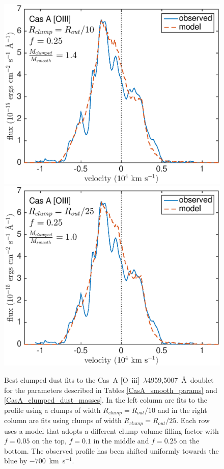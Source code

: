 \begin{figure}
\vspace{6mm}
\includegraphics[scale=0.43,clip=true, trim=30 0 50 20]{chapters/chapter6/figs/CasA/clumped/CasA_OIII_c10_f0_25}
\includegraphics[scale=0.43,clip=true, trim=30 0 40 20]{chapters/chapter6/figs/CasA/clumped/CasA_OIII_c25_f0_25}

\caption{Best clumped dust fits to the Cas~A [O~{\sc iii}]~$\lambda$4959,5007~\AA\ doublet for the parameters described in Tables \ref{CasA_smooth_params} and \ref{CasA_clumped_dust_masses}.  In the left column are fits to the profile using a clumps of width $R_{clump}=R_{out}/10$ and in the right column are fits using clumps of width $R_{clump}=R_{out}/25$.  Each row uses a model that adopts a different clump volume filling factor with $f=0.05$ on the top, $f=0.1$ in the middle and $f=0.25$ on the bottom.  The observed profile has been shifted uniformly towards the blue by $-700$~km~s$^{-1}$.}
\label{CasA_OIII_clumped}
\end{figure}

